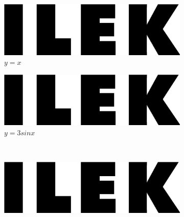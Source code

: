 %		
%		


\begin{figure}
	\centering
	\begin{subfigure}[b]{0.3\textwidth}
		\centering
		\includegraphics[width=\textwidth]{Images/ILEK-logo.jpg}
		\caption{$y=x$}
		\label{fig:a}
	\end{subfigure}
\hspace{1cm}
	\begin{subfigure}[b]{0.3\textwidth}
		\centering
		\includegraphics[width=\textwidth]{Images/ILEK-logo.jpg}
		\caption{$y=3sinx$}
		\label{fig:b}
	\end{subfigure}
	\\ 
	\begin{subfigure}[b]{0.3\textwidth}
		\centering
		\includegraphics[width=\textwidth]{Images/ILEK-logo.jpg}

\end{subfigure}
\end{figure}
